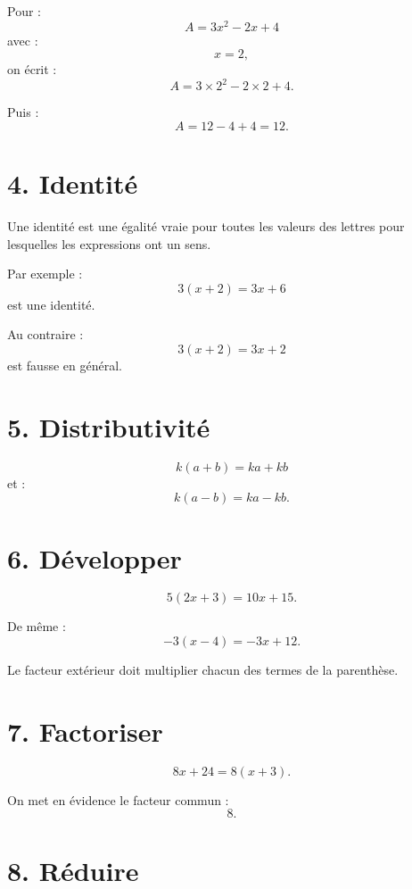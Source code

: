 Pour :
\[
A=3x^2-2x+4
\]
avec :
\[
x=2,
\]
on écrit :
\[
A=3\times2^2-2\times2+4.
\]

Puis :
\[
A=12-4+4=12.
\]

\section{4. Identité}

\begin{definition}
Une identité est une égalité vraie pour toutes les valeurs des lettres pour lesquelles les expressions ont un sens.
\end{definition}

Par exemple :
\[
3(x+2)=3x+6
\]
est une identité.

Au contraire :
\[
3(x+2)=3x+2
\]
est fausse en général.

\section{5. Distributivité}


\begin{propriete}
\[
\boxed{k(a+b)=ka+kb}
\]
et :
\[
\boxed{k(a-b)=ka-kb}.
\]
\end{propriete}

\section{6. Développer}

\[
5(2x+3)=10x+15.
\]

De même :
\[
-3(x-4)=-3x+12.
\]

Le facteur extérieur doit multiplier chacun des termes de la parenthèse.

\section{7. Factoriser}

\[
8x+24=8(x+3).
\]

On met en évidence le facteur commun :
\[
8.
\]

\section{8. Réduire}

